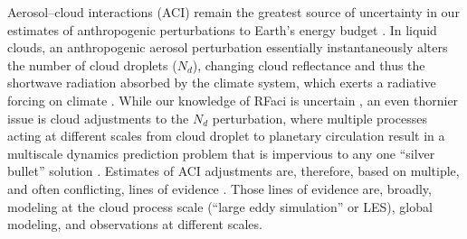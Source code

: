 \documentclass[acp, manuscript]{copernicus}\usepackage[]{graphicx}\usepackage[]{xcolor}
\newcommand\nd{\ensuremath{N_d}}
\newcommand\lwp{\ensuremath{\mathcal L}}
\begin{document}

\introduction  %

Aerosol--cloud interactions (ACI) remain the greatest source of uncertainty in
our estimates of anthropogenic perturbations to Earth's energy budget
\citep{Boucher2014, Forster2021}.  In liquid clouds, an anthropogenic aerosol
perturbation essentially instantaneously alters the number of cloud droplets
(\nd), changing cloud reflectance and thus the shortwave radiation
absorbed by the climate system, which
exerts a radiative forcing on climate \citep[``radiative forcing by
aerosol--cloud interactions'' or RFaci;][]{Twomey1977, Boucher2014}.  While our
knowledge of RFaci is uncertain \citep{Quaas2020}, an even thornier issue is
cloud adjustments to the \nd{} perturbation, where multiple processes acting at
different scales from cloud droplet to planetary circulation
\citep{Stevens2009} result in a multiscale dynamics prediction problem that is impervious
to any one ``silver bullet'' solution \citep{Muelmenstaedt2018}.  Estimates of
ACI adjustments are, therefore, based on multiple, and often conflicting, lines of
evidence \citep{Boucher2014,Bellouin2020,Forster2021}. Those lines of
evidence are, broadly, modeling at the cloud
process scale (``large eddy simulation'' or LES), global modeling, and observations at different scales.
\end{document}
